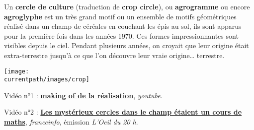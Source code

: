 

\vfill

\begin{debat} 
    Un {\bf cercle de culture} (traduction de {\bf crop circle}), ou {\bf agrogramme} ou encore {\bf agroglyphe} est un très grand motif ou un ensemble de motifs géométriques réalisé dans un champ de céréales en couchant les épis au sol, ils sont apparus pour la première fois dans les années 1970. Ces formes impressionnantes sont visibles depuis le ciel. Pendant plusieurs années, on croyait que leur origine était extra-terrestre jusqu'à ce que l'on découvre leur vraie origine\dots{} terrestre.
    \begin{center} 
       \texttt{[image: \\currentpath/images/crop]}
    \end{center}
    \bigskip
    \begin{cadre}[B2][F4]
       \begin{center}        
        Vidéo n°1 : \href{https://www.youtube-nocookie.com/embed/AqjSJuhdZ_s?playlist=AqjSJuhdZ_s&autoplay=1&iv_load_policy=3&loop=1&modestbranding=1&start=}{\bf making of de la réalisation}, {\it youtube}.

        Vidéo n°2 : \href{https://www.francetvinfo.fr/replay-jt/france-2/20-heures/video-en-alsace-les-mysterieux-cercles-dans-le-champ-etaient-un-cours-de-maths_3505711.html}{\bf Les mystérieux cercles dans le champ étaient un cours de maths}, {\it franceinfo}, émission {\it L'Oeil du 20 h}.
       \end{center}
    \end{cadre}
 \end{debat}